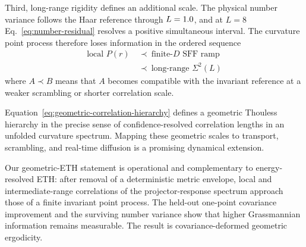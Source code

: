 Third, long-range rigidity defines an additional scale.  The physical number
variance follows the Haar reference through \(L=1.0\), and
at \(L=8\) Eq.~\eqref{eq:number-residual} resolves a positive simultaneous
interval.
The curvature point process therefore loses information in the ordered
sequence
\begin{equation}
 \begin{aligned}
 \text{local }P(r)
 &\ \prec\ \text{finite-\(D\) SFF ramp}\\
 &\ \prec\ \text{long-range }\Sigma^2(L)
 \end{aligned}
 \label{eq:geometric-correlation-hierarchy}
\end{equation}
where \(A\prec B\) means that \(A\) becomes compatible with the invariant
reference at a weaker scrambling or shorter correlation scale.

Equation~\eqref{eq:geometric-correlation-hierarchy} defines a geometric
Thouless hierarchy in the precise sense of confidence-resolved correlation
lengths in an unfolded curvature spectrum.  Mapping these geometric scales to
transport, scrambling, and real-time diffusion is a promising dynamical
extension.

Our geometric-ETH statement is operational and complementary to
energy-resolved ETH: after removal of a deterministic
metric envelope, local and intermediate-range correlations of the
projector-response spectrum approach those of a finite invariant point
process.
The held-out one-point covariance improvement and the surviving number
variance show that higher Grassmannian information remains measurable.  The
result is covariance-deformed geometric ergodicity.
